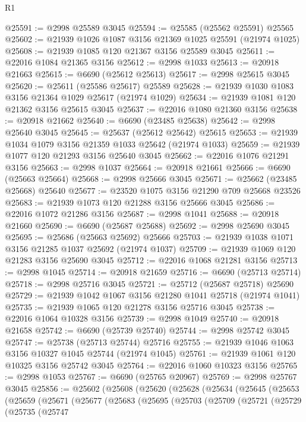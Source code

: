 \begin{lexlean}{R1}
\begin{coremodule}
@25591 := @2998 @25589 @3045
@25594 := @25585 (@25562 @25591) @25565
@25602 := @21939 @1026 @1087 @3156 @21369 @1025 @25591 (@21974 @1025)
@25608 := @21939 @1085 @120 @21367 @3156 @25589 @3045
@25611 := @22016 @1084 @21365 @3156
@25612 := @2998 @1033
@25613 := @20918 @21663
@25615 := @6690 (@25612 @25613)
@25617 := @2998 @25615 @3045
@25620 := @25611 (@25586 @25617) @25589
@25628 := @21939 @1030 @1083 @3156 @21364 @1029 @25617 (@21974 @1029)
@25634 := @21939 @1081 @120 @21362 @3156 @25615 @3045
@25637 := @22016 @1080 @21360 @3156
@25638 := @20918 @21662
@25640 := @6690 (@23485 @25638)
@25642 := @2998 @25640 @3045
@25645 := @25637 (@25612 @25642) @25615
@25653 := @21939 @1034 @1079 @3156 @21359 @1033 @25642 (@21974 @1033)
@25659 := @21939 @1077 @120 @21293 @3156 @25640 @3045
@25662 := @22016 @1076 @21291 @3156
@25663 := @2998 @1037
@25664 := @20918 @21661
@25666 := @6690 (@25663 @25664)
@25668 := @2998 @25666 @3045
@25671 := @25662 (@23485 @25668) @25640
@25677 := @23520 @1075 @3156 @21290 @709 @25668 @23526
@25683 := @21939 @1073 @120 @21288 @3156 @25666 @3045
@25686 := @22016 @1072 @21286 @3156
@25687 := @2998 @1041
@25688 := @20918 @21660
@25690 := @6690 (@25687 @25688)
@25692 := @2998 @25690 @3045
@25695 := @25686 (@25663 @25692) @25666
@25703 := @21939 @1038 @1071 @3156 @21285 @1037 @25692 (@21974 @1037)
@25709 := @21939 @1069 @120 @21283 @3156 @25690 @3045
@25712 := @22016 @1068 @21281 @3156
@25713 := @2998 @1045
@25714 := @20918 @21659
@25716 := @6690 (@25713 @25714)
@25718 := @2998 @25716 @3045
@25721 := @25712 (@25687 @25718) @25690
@25729 := @21939 @1042 @1067 @3156 @21280 @1041 @25718 (@21974 @1041)
@25735 := @21939 @1065 @120 @21278 @3156 @25716 @3045
@25738 := @22016 @1064 @10328 @3156
@25739 := @2998 @1049
@25740 := @20918 @21658
@25742 := @6690 (@25739 @25740)
@25744 := @2998 @25742 @3045
@25747 := @25738 (@25713 @25744) @25716
@25755 := @21939 @1046 @1063 @3156 @10327 @1045 @25744 (@21974 @1045)
@25761 := @21939 @1061 @120 @10325 @3156 @25742 @3045
@25764 := @22016 @1060 @10323 @3156
@25765 := @2998 @1053
@25767 := @6690 (@25765 @20967)
@25769 := @2998 @25767 @3045
@25856 := @25602
    (@25608
      (@25620
        (@25628
          (@25634
            (@25645
              (@25653
                (@25659
                  (@25671
                    (@25677
                      (@25683
                        (@25695
                          (@25703
                            (@25709
                              (@25721
                                (@25729
                                  (@25735
                                    (@25747

\end{coremodule}
\end{lexlean}
